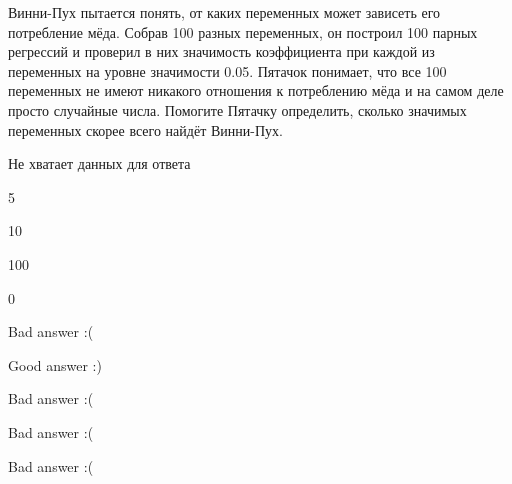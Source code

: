 
\begin{question}
Винни-Пух пытается понять, от каких переменных может зависеть его потребление мёда. Собрав 100 разных переменных, он построил 100 парных регрессий и проверил в них значимость коэффициента при каждой из переменных на уровне значимости 0.05. Пятачок понимает, что все 100 переменных не имеют никакого отношения к потреблению мёда и на самом деле просто случайные числа. Помогите Пятачку определить, сколько значимых переменных скорее всего найдёт Винни-Пух.
\begin{answerlist}
  \item Не хватает данных для ответа
  \item 5
  \item 10
  \item 100
  \item 0
\end{answerlist}
\end{question}

\begin{solution}
\begin{answerlist}
  \item Bad answer :(
  \item Good answer :)
  \item Bad answer :(
  \item Bad answer :(
  \item Bad answer :(
\end{answerlist}
\end{solution}

